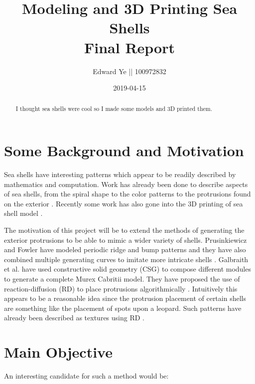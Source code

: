 \documentclass[a4paper]{article}
\title{Modeling and 3D Printing Sea Shells\\
		\large Final Report}
\author{Edward Ye || 100972832}
\date{2019-04-15}
\begin{document}
\maketitle

\begin{abstract}
	I thought sea shells were cool so I made some models and 3D printed them.
\end{abstract}

\section*{Some Background and Motivation}

Sea shells have interesting patterns which  appear to be readily described by mathematics and computation. Work has already been done to describe aspects of sea shells, from the spiral shape to the color patterns to the protrusions found on the exterior \cite{Galbraith00modelingmurex}\cite{abss}\cite{VANDERHELM1998505}. Recently some work has also gone into the 3D printing of sea shell model \cite{3dprinting-seashells}\cite{bachman-3dprinting}.

The motivation of this project will be to extend the methods of generating the exterior protrusions to be able to mimic a wider variety of shells. Prusinkiewicz and Fowler have modeled periodic ridge and bump patterns and they have also combined multiple generating curves to imitate more intricate shells \cite{abss}. Galbraith et al. have used constructive solid geometry (CSG) to compose different modules to generate a complete Murex Cabritii model. They have proposed the use of reaction-diffusion (RD) to place protrusions algorithmically \cite{Galbraith00modelingmurex}. Intuitively this appears to be a reasonable idea since the protrusion placement of certain shells are something like the placement of spots upon a leopard. Such patterns have already been described as textures using RD \cite{Turk:1991:GTA:127719.122749}.

\section*{Main Objective}

An interesting candidate for such a method would be:
\end{document}
